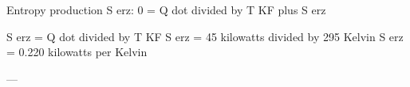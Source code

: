 Entropy production S erz:  
0 = Q dot divided by T KF plus S erz  

S erz = Q dot divided by T KF  
S erz = 45 kilowatts divided by 295 Kelvin  
S erz = 0.220 kilowatts per Kelvin  

---